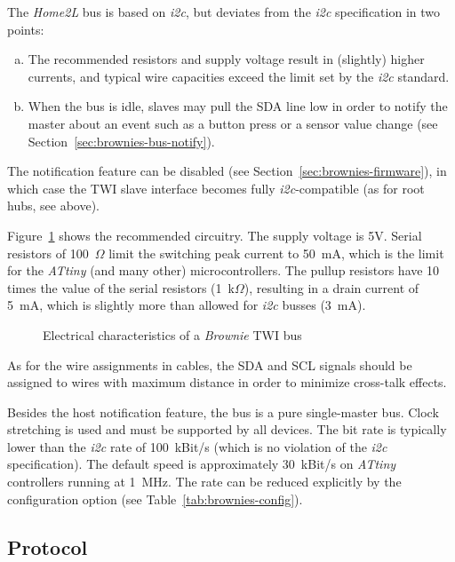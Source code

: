 \documentclass[12pt,english,parskip=half,headheight=19pt]{scrreprt}
\newcommand{\figsvg}[2][]{}            %
\newcommand{\figsvg}[2][]{\href{#2}{}} %
\newcommand{\lst}[1]{\colorbox{lstbackground}{\footnotesize\code{#1}}}
\begin{document}
The \textit{Home2L} bus is based on \textit{i2c}, but deviates from the \textit{i2c} specification in two points:
\begin{enumerate}[a)]
  \item The recommended resistors and supply voltage result in (slightly) higher currents, and typical wire capacities exceed the limit set by the \textit{i2c} standard.
  \item When the bus is idle, slaves may pull the SDA line low in order to notify the master about an event such as a button press or a sensor value change (see Section~\ref{sec:brownies-bus-notify}).
\end{enumerate}

The notification feature can be disabled (see Section~\ref{sec:brownies-firmware}), in which case the TWI slave interface becomes fully \textit{i2c}-compatible (as for root hubs, see above).

Figure~\ref{fig:brownies-electrical} shows the recommended circuitry. The supply voltage is 5V. Serial resistors of 100~$\Omega$ limit the switching peak current to 50~mA, which is the limit for the \textit{ATtiny} (and many other) microcontrollers. The pullup resistors have 10 times the value of the serial resistors (1~k$\Omega$), resulting in a drain current of 5~mA, which is slightly more than allowed for \textit{i2c} busses (3~mA).

\begin{figure}[ht]
  \centering
  \figsvg{figs/brownies-electrical.svg}
  \caption[l]{Electrical characteristics of a \textit{Brownie} TWI bus}
  \label{fig:brownies-electrical}
\end{figure}

As for the wire assignments in cables, the SDA and SCL signals should be assigned to wires with maximum distance in order to minimize cross-talk effects.

Besides the host notification feature, the bus is a pure single-master bus. Clock stretching is used and must be supported by all devices. The bit rate is typically lower than the \textit{i2c}
rate of 100~kBit/s (which is no violation of the \textit{i2c} specification). The default speed is approximately 30~kBit/s on \textit{ATtiny} controllers running at 1~MHz. The rate can be reduced explicitly by the \lst{hub_speed} configuration option (see Table~\ref{tab:brownies-config}).



\subsection{Protocol}
\label{sec:brownies-bus-protocol}
\end{document}
